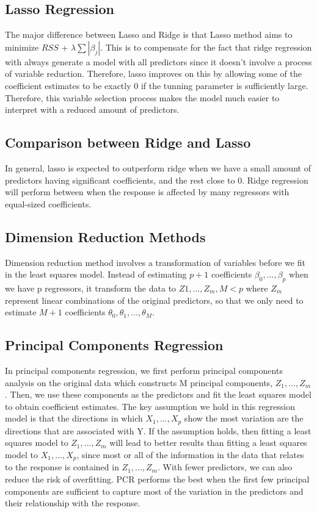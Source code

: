 \documentclass{article}
\begin{document}
\subsection{Lasso Regression}

The major difference between Lasso and Ridge is that Lasso method aims to minimize $RSS$ + $\lambda \sum |{\beta_j}|$. This is to compensate for the fact that ridge regression with always generate a model with all predictors since it doesn't involve a process of variable reduction. Therefore, lasso improves on this by allowing some of the coefficient estimates to be exactly 0 if the tunning parameter is sufficiently large. Therefore, this variable selection process makes the model much easier to interpret with a reduced amount of predictors. 

\subsection{Comparison between Ridge and Lasso}

In general, lasso is expected to outperform ridge when we have a small amount of predictors having significant coefficients, and the rest close to 0. Ridge regression will perform between when the response is affected by many regressors with equal-sized coefficients. 


\subsection{Dimension Reduction Methods}

Dimension reduction method involves a transformation of variables before we fit in the least squares model. Instead of estimating $p + 1$ coefficients $\beta_0, ..., \beta_p$ when we have p regressors, it transform the data to $Z1, ..., Z_m, M < p$ where $Z_m$ represent linear combinations of the original predictors, so that we only need to estimate $M + 1$ coefficients $\theta_0, \theta_1, ..., \theta_M$. 

\subsection{Principal Components Regression}

In principal components regression, we first perform principal components analysis on the original data which constructs M principal components, $Z_1, ..., Z_m$. Then, we use these components as the predictors and fit the least squares model to obtain coefficient estimates. The key assumption we hold in this regression model is that the directions in which $X_1, ..., X_p$ show the most variation are the directions that are associated with Y. If the assumption holds, then fitting a least squares model to $Z_1, ..., Z_m$ will lead to better results than fitting a least squares model to $X_1, ..., X_p$, since most or all of the information in the data that relates to the response is contained in $Z_1, ..., Z_m$. With fewer predictors, we can also reduce the risk of overfitting. PCR performs the best when the first few principal components are sufficient to capture most of the variation in the predictors and their relationship with the response.
\end{document}
